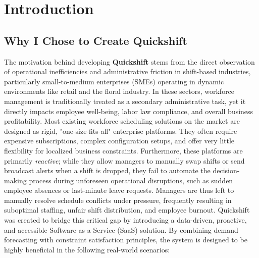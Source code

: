 \chapter{Introduction}
\label{intro}

\section{Why I Chose to Create Quickshift}

\label{sec:why_quickshift}
The motivation behind developing \textbf{Quickshift} stems from the direct observation of operational inefficiencies and administrative friction in shift-based industries, particularly small-to-medium enterprises (SMEs) operating in dynamic environments like retail and the floral industry. In these sectors, workforce management is traditionally treated as a secondary administrative task, yet it directly impacts employee well-being, labor law compliance, and overall business profitability. 
Most existing workforce scheduling solutions on the market are designed as rigid, "one-size-fits-all" enterprise platforms. They often require expensive subscriptions, complex configuration setups, and offer very little flexibility for localized business constraints. Furthermore, these platforms are primarily \emph{reactive}; while they allow managers to manually swap shifts or send broadcast alerts when a shift is dropped, they fail to automate the decision-making process during unforeseen operational disruptions, such as sudden employee absences or last-minute leave requests. Managers are thus left to manually resolve schedule conflicts under pressure, frequently resulting in suboptimal staffing, unfair shift distribution, and employee burnout.
Quickshift was created to bridge this critical gap by introducing a data-driven, proactive, and accessible Software-as-a-Service (SaaS) solution. By combining demand forecasting with constraint satisfaction principles, the system is designed to be highly beneficial in the following real-world scenarios:


